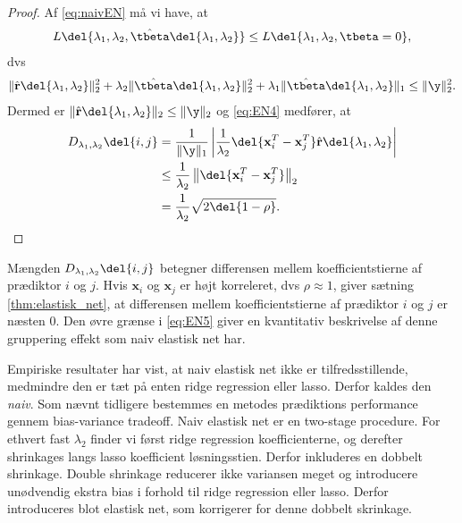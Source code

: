 \begin{proof}
Af \eqref{eq:naivEN} må vi have, at
\begin{align*}
L \del{\lambda_1,\lambda_2, \hat{\tbeta}\del{\lambda_1, \lambda_2}} \leq L \del{\lambda_1,\lambda_2, \tbeta = 0},  
\end{align*}
dvs
\begin{align*}
\Vert \hat{\mathbf{r}} \del{\lambda_1, \lambda_2} \Vert_2^2 + \lambda_2 \Vert \hat{\tbeta} \del{\lambda_1, \lambda_2} \Vert_2^2 + \lambda_1 \Vert \hat{\tbeta} \del{\lambda_1, \lambda_2} \Vert_1 \leq \Vert \y \Vert_2^2.  
\end{align*}
Dermed er \(\Vert \hat{\mathbf{r}} \del{\lambda_1, \lambda_2} \Vert_2 \leq \Vert \y \Vert_2\) og \eqref{eq:EN4} medfører, at
\begin{align*}
D_{\lambda_1, \lambda_2} \del{i,j} &= \frac{1}{\Vert \y \Vert_1} \left\vert \frac{1}{\lambda_2} \del{\mathbf{x}_i^T-\mathbf{x}_j^T} \hat{\mathbf{r}}\del{\lambda_1, \lambda_2} \right\vert \\ 
&\leq \frac{1}{\lambda_2} \left\Vert \del{\mathbf{x}_i^T-\mathbf{x}_j^T} \right\Vert_2 \\ 
&= \frac{1}{\lambda_2} \sqrt{2 \del{1-\rho}}.
\end{align*}
\end{proof}
%
Mængden \(D_{\lambda_1, \lambda_2} \del{i,j}\) betegner differensen mellem koefficientstierne af prædiktor \(i\) og \(j\).
Hvis \(\mathbf{x}_i\) og \(\mathbf{x}_j\) er højt korreleret, dvs \(\rho \approx 1\), giver sætning \ref{thm:elastisk_net}, at differensen mellem koefficientstierne af prædiktor \(i\) og \(j\) er næsten 0.
Den øvre grænse i \eqref{eq:EN5} giver en kvantitativ beskrivelse af denne gruppering effekt som naiv elastisk net har.

Empiriske resultater har vist, at naiv elastisk net ikke er tilfredsstillende, medmindre den er tæt på enten ridge regression eller lasso.
Derfor kaldes den \textit{naiv}.
Som nævnt tidligere bestemmes en metodes prædiktions performance gennem bias-variance tradeoff. 
Naiv elastisk net er en two-stage procedure. For ethvert fast \(\lambda_2\) finder vi først ridge regression koefficienterne, og derefter shrinkages langs lasso koefficient løsningsstien. Derfor inkluderes en dobbelt shrinkage.
Double shrinkage reducerer ikke variansen meget og introducere unødvendig ekstra bias i forhold til ridge regression eller lasso.
Derfor introduceres blot elastisk net, som korrigerer for denne dobbelt skrinkage.

